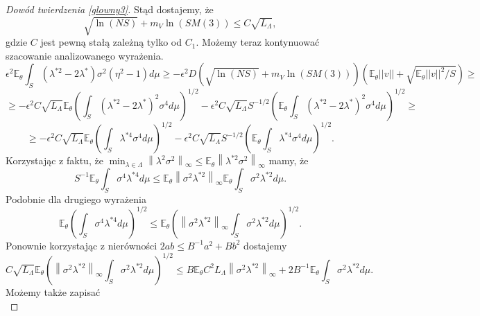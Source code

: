 \documentclass{article}
\newcommand{\norm}[1]{\left\lVert#1\right\rVert}
\begin{document}
\begin{proof}[Dowód twierdzenia \ref{glowny3}]
Stąd dostajemy, że 
\begin{displaymath}
\sqrt{\ln (NS)}+m_V\ln (SM(3))\leq C\sqrt{L_{\Lambda}},
\end{displaymath}
gdzie $C$ jest pewną stałą zależną tylko od $C_1$. Możemy teraz kontynuować szacowanie analizowanego wyrażenia.
\begin{displaymath}
\epsilon^2\mathbb{E}_{\theta}\int_S(\lambda^{*2}-2\lambda^*)\sigma^2(\eta^2-1)d\mu\geq -\epsilon^2D\left(\sqrt{\ln (NS)}+m_V\ln (SM(3))\right)\left(\mathbb{E}_{\theta}||v||+\sqrt{\mathbb{E}_{\theta}||v||^2/S}\right)\geq
\end{displaymath}
\begin{displaymath}
\geq -\epsilon^2C\sqrt{L_{\Lambda}}\mathbb{E}_{\theta}\left(\int_S(\lambda^{*2}-2\lambda^*)^2\sigma^4d\mu\right)^{1/2}-\epsilon^2C\sqrt{L_{\Lambda}}S^{-1/2}\left(\mathbb{E}_{\theta}\int_S(\lambda^{*2}-2\lambda^*)^2\sigma^4 d\mu\right)^{1/2}\geq
\end{displaymath}
\begin{displaymath}
\geq -\epsilon^2C\sqrt{L_{\Lambda}}\mathbb{E}_{\theta}\left(\int_S\lambda^{*4}\sigma^4d\mu\right)^{1/2}-\epsilon^2C\sqrt{L_{\Lambda}}S^{-1/2}\left(\mathbb{E}_{\theta}\int_S\lambda^{*4}\sigma^4d\mu\right)^{1/2}.
\end{displaymath}
Korzystając z faktu, że $\min_{\lambda\in \Lambda}\norm{\lambda^2\sigma^2}_{\infty}\leq \mathbb{E}_{\theta}\norm{\lambda^{*2}\sigma^2}_{\infty}$ mamy, że
\begin{displaymath}
S^{-1}\mathbb{E}_{\theta}\int_S\sigma^4\lambda^{*4}d\mu\leq 
 \mathbb{E}_{\theta}\norm{\sigma^2\lambda^{*2}}_{\infty}\mathbb{E}_{\theta}\int_S\sigma^2\lambda^{*2}d\mu.
\end{displaymath}
Podobnie dla drugiego wyrażenia
\begin{displaymath}
\mathbb{E}_{\theta}\left(\int_S\sigma^4\lambda^{*4}d\mu\right)^{1/2}\leq \mathbb{E}_{\theta}\left(\norm{\sigma^2\lambda^{*2}}_{\infty}\int_S\sigma^2\lambda^{*2}d\mu\right)^{1/2}.
\end{displaymath}
Ponownie korzystając z nierówności $2ab\leq B^{-1}a^2+Bb^2$ dostajemy
\begin{displaymath}
C\sqrt{L_{\Lambda}}\mathbb{E}_{\theta}\left(\norm{\sigma^2\lambda^{*2}}_{\infty}\int_S\sigma^2\lambda^{*2}d\mu\right)^{1/2}
\leq B\mathbb{E}_{\theta}C^2L_{\Lambda}\norm{\sigma^2\lambda^{*2}}_{\infty}+2B^{-1}\mathbb{E}_{\theta}\int_S\sigma^2\lambda^{*2}d\mu.
\end{displaymath}
Możemy także zapisać
\begin{displaymath}

\end{displaymath}
\end{proof}
\end{document}
